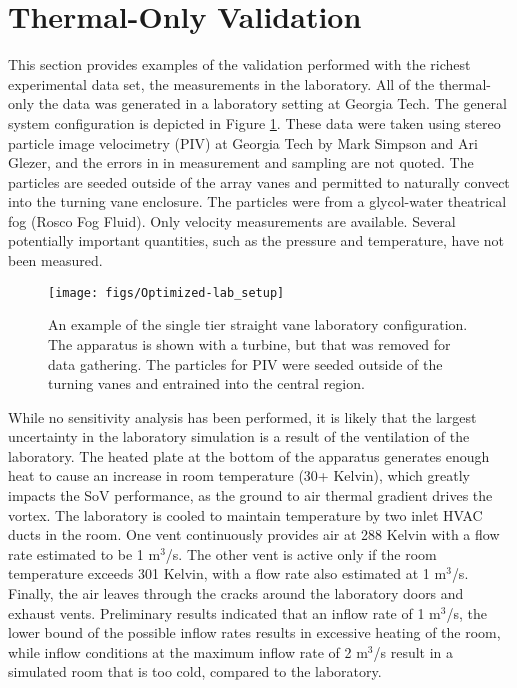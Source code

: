 \section{Thermal-Only Validation}
This section provides examples of the validation performed with the
richest experimental data set, the measurements in the laboratory. All of the
thermal-only the data was generated in a laboratory setting at Georgia
Tech. The general system configuration is depicted in Figure
\ref{fig:lab_image}. These data were taken using stereo particle image
velocimetry (PIV) at Georgia Tech by Mark Simpson and Ari Glezer, and
the errors in in measurement and sampling are 
not quoted. The particles are seeded outside of the array vanes and
permitted to naturally convect into the turning vane enclosure. The
particles were from a glycol-water theatrical fog (Rosco Fog Fluid). 
Only velocity measurements are available. Several
potentially important quantities, such as the pressure and
temperature, have not been measured. 

%
%
 \begin{figure}[!htb]
   \begin{center}
    \texttt{[image: figs/Optimized-lab\_setup]}
    \caption{An example of the single tier straight vane laboratory
    configuration. The apparatus is shown with a turbine, but that was
    removed for data gathering. The particles for PIV were seeded
    outside of the turning vanes and entrained into the central region.}
    \label{fig:lab_image}
   \end{center}
 \end{figure}

While no sensitivity analysis has been performed, it is likely that the
largest uncertainty in the laboratory simulation is a result of the
ventilation of the laboratory. The heated plate at the bottom of the
apparatus generates enough heat to cause an increase in room
temperature (30+ Kelvin), which greatly impacts the SoV
performance, as the ground to air thermal gradient drives the
vortex. The laboratory is cooled to maintain
temperature by two inlet HVAC ducts in the room. 
One vent continuously provides air at 288 Kelvin with a flow rate estimated 
to be 1 $\text{m}^3$/s.
The other vent is active only if the room temperature exceeds 301 Kelvin, 
with a flow rate also estimated at 1 $\text{m}^3$/s\cite{mark_comm}.
Finally, the air leaves through the cracks around the laboratory doors and 
exhaust vents. Preliminary results indicated that an inflow rate of 1
$\text{m}^3$/s, the lower bound of the possible inflow rates results in
excessive heating of the room, while inflow conditions at the maximum
inflow rate of 2 $\text{m}^3$/s result in a simulated room that is too cold,
compared to the laboratory.  

